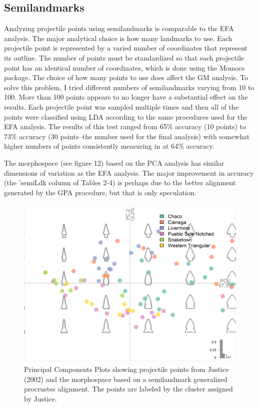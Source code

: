 \documentclass{article}
\begin{document}
\hypertarget{semilandmarks}{%
\subsection{Semilandmarks}\label{semilandmarks}}

Analyzing projectile points using semilandmarks is comparable to the EFA
analysis. The major analytical choice is how many landmarks to use. Each
projectile point is represented by a varied number of coordinates that
represent its outline. The number of points must be standardized so that
each projectile point has an identical number of coordinates, which is
done using the Momocs package. The choice of how many points to use does
affect the GM analysis. To solve this problem, I tried different numbers
of semilandmarks varying from 10 to 100. More than 100 points appears to
no longer have a substantial effect on the results. Each projectile
point was sampled multiple times and then all of the points were
classified using LDA according to the same procedures used for the EFA
analysis. The results of this test ranged from 65\% accuracy (10 points)
to 73\% accuracy (30 points--the number used for the final analysis)
with somewhat higher numbers of points consistently measuring in at 64\%
accuracy.

The morphospace (see figure 12) based on the PCA analysis has similar
dimensions of variation as the EFA analysis. The major improvement in
accuracy (the 'semiLdk column of Tables 2-4) is perhaps due to the
better alignment generated by the GPA procedure, but that is only
speculation.

\begin{figure}
\includegraphics[width=1\linewidth]{figures/JusticeSLDKPCA} \caption{Principal Components Plots showing projectile points from Justice (2002) and the morphospace based on a semilandmark generalized procrustes alignment. The points are labeled by the cluster assigned by Justice.}\label{fig:JusticeSLDKPCA}
\end{figure}
\end{document}
